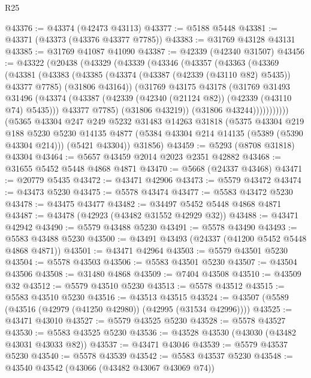 \begin{lexlean}{R25}
\begin{coremodule}
@43376 := @43374 (@42473 @43113)
@43377 := @5188 @5448
@43381 := @43371 (@43373 (@43376 @43377 @7785))
@43383 := @31769 @43128 @43131
@43385 := @31769 @41087 @41090
@43387 := @42339 (@42340 @31507)
@43456 := @43322
    (@20438
      (@43329
        (@43339
          (@43346
            (@43357
              (@43363
                (@43369
                  (@43381
                    (@43383
                      (@43385
                        (@43374 (@43387 (@42339 (@43110 @82) @5435)) @43377 @7785)
                        (@31806 @43164))
                      (@31769
                        @43175
                        @43178
                        (@31769
                          @31493
                          @31496
                          (@43374
                            (@43387 (@42339 (@42340 (@21124 @82)) (@42339 (@43110 @74) @5435)))
                            @43377
                            @7785)
                          (@31806 @43219))
                        (@31806 @43244)))))))))))
    (@5365
      @43304
      @247
      @249
      @5232
      @31483
      @14263
      @31818
      (@5375
        @43304
        @219
        @188
        @5230
        @5230
        @14135
        @4877
        (@5384 @43304 @214 @14135 (@5389 (@5390 @43304 @214)))
        (@5421 @43304))
      @31856)
@43459 := @5293 (@8708 @31818) @43304
@43464 := @5657 @43459 @2014 @2023 @2351 @42882
@43468 := @31655 @5452 @5448 @4868 @4871
@43470 := @5668 (@24337 @43468)
@43471 := @20779 @5435
@43472 := @43471 @42906
@43473 := @5579 @43472
@43474 := @43473 @5230
@43475 := @5578 @43474
@43477 := @5583 @43472 @5230
@43478 := @43475 @43477
@43482 := @34497 @5452 @5448 @4868 @4871
@43487 := @43478 (@42923 (@43482 @31552 @42929 @32))
@43488 := @43471 @42942
@43490 := @5579 @43488 @5230
@43491 := @5578 @43490
@43493 := @5583 @43488 @5230
@43500 := @43491 @43493 (@24337 (@41200 @5452 @5448 @4868 @4871))
@43501 := @43471 @42964
@43503 := @5579 @43501 @5230
@43504 := @5578 @43503
@43506 := @5583 @43501 @5230
@43507 := @43504 @43506
@43508 := @31480 @4868
@43509 := @7404 @43508
@43510 := @43509 @32
@43512 := @5579 @43510 @5230
@43513 := @5578 @43512
@43515 := @5583 @43510 @5230
@43516 := @43513 @43515
@43524 := @43507 (@5589 (@43516 (@42979 (@41250 @42980)) (@42995 (@31534 @42996))))
@43525 := @43471 @43010
@43527 := @5579 @43525 @5230
@43528 := @5578 @43527
@43530 := @5583 @43525 @5230
@43536 := @43528 @43530 (@43030 (@43482 @43031 @43033 @82))
@43537 := @43471 @43046
@43539 := @5579 @43537 @5230
@43540 := @5578 @43539
@43542 := @5583 @43537 @5230
@43548 := @43540 @43542 (@43066 (@43482 @43067 @43069 @74))

\end{coremodule}
\end{lexlean}
